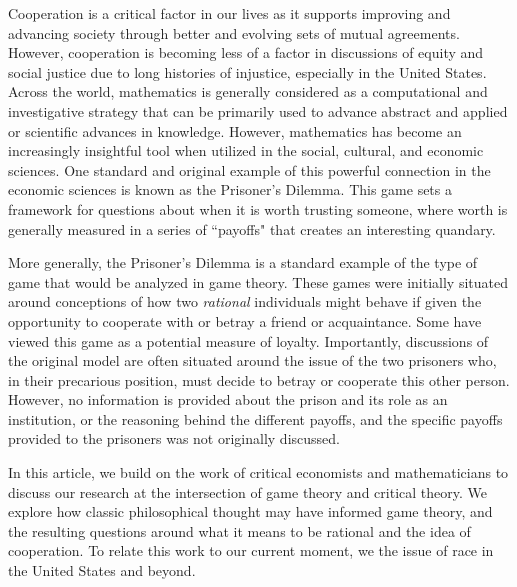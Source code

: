 \documentclass[12pt,twoside]{article}
\begin{document}
Cooperation is a critical factor in our lives as it supports improving and advancing society through better and evolving sets of mutual agreements. However, cooperation is becoming less of a factor in discussions of equity and social justice due to long histories of injustice, especially in the United States. Across the world, mathematics is generally considered as a computational and investigative strategy that can be primarily used to advance abstract and applied or scientific advances in knowledge. However, mathematics has become an increasingly insightful tool when utilized in the social, cultural, and economic sciences. One standard and original example of this powerful connection in the economic sciences is known as the  Prisoner's Dilemma. This game sets a framework for questions about when it is worth trusting someone, where worth is generally measured in a series of ``payoffs" that creates an interesting quandary.

\noindent More generally, the Prisoner's Dilemma is a standard example of the type of game that would be analyzed in game theory. These games were initially situated around conceptions of how two \textit{rational} individuals might behave if given the opportunity to cooperate with or betray a friend or acquaintance. Some have viewed this game as a potential measure of loyalty. Importantly, discussions of the original model are often situated around the issue of the two prisoners who, in their precarious position, must decide to betray or cooperate this other person. However, no information is provided about the prison and its role as an institution, or the reasoning behind the different payoffs, and the specific payoffs provided to the prisoners was not originally discussed.

\noindent In this article, we build on the work of critical economists and mathematicians to discuss our research at the intersection of game theory and critical theory. We explore how classic philosophical thought may have informed game theory, and the resulting questions around what it means to be rational and the idea of cooperation. To relate this work to our current moment, we  the issue of race in the United States and beyond. 


\end{document}
